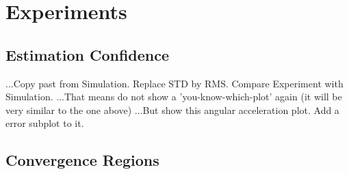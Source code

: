 \section{Experiments}
\subsection{Estimation Confidence}
...Copy past from Simulation. Replace STD by RMS. Compare Experiment with Simulation.
...That means do not show a 'you-know-which-plot' again (it will be very similar to the one above)
...But show this angular acceleration plot. Add a error subplot to it.
\subsection{Convergence Regions}

